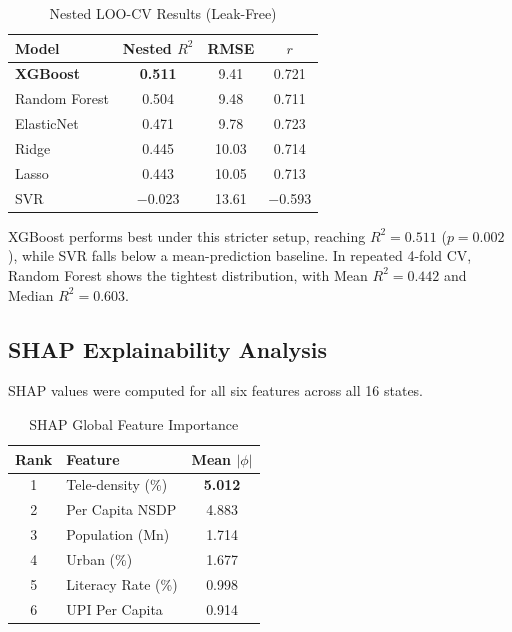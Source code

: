 \documentclass[conference]{IEEEtran}
\begin{document}
\begin{table}[!t]
\centering
\caption{Nested LOO-CV Results (Leak-Free)}
\label{tab:nested_cv}
\renewcommand{\arraystretch}{1.15}
\begin{tabular}{@{}lccc@{}}
\toprule
\textbf{Model} & \textbf{Nested $R^2$} & \textbf{RMSE} & \textbf{$r$} \\
\midrule
\textbf{XGBoost} & \textbf{0.511} & 9.41 & 0.721 \\
Random Forest    & 0.504          & 9.48 & 0.711 \\
ElasticNet       & 0.471          & 9.78 & 0.723 \\
Ridge            & 0.445          & 10.03 & 0.714 \\
Lasso            & 0.443          & 10.05 & 0.713 \\
SVR              & $-$0.023       & 13.61 & $-$0.593 \\
\bottomrule
\end{tabular}
\end{table}

XGBoost performs best under this stricter setup, reaching $R^2 = 0.511$ ($p = 0.002$), while SVR falls below a mean-prediction baseline. In repeated 4-fold CV, Random Forest shows the tightest distribution, with Mean $R^2 = 0.442$ and Median $R^2 = 0.603$.

\subsection{SHAP Explainability Analysis}

SHAP values were computed for all six features across all 16 states.

\begin{table}[!t]
\centering
\caption{SHAP Global Feature Importance}
\label{tab:shap}
\renewcommand{\arraystretch}{1.15}
\begin{tabular}{@{}clc@{}}
\toprule
\textbf{Rank} & \textbf{Feature} & \textbf{Mean $|\phi|$} \\
\midrule
1 & Tele-density (\%)          & \textbf{5.012} \\
2 & Per Capita NSDP            & 4.883 \\
3 & Population (Mn)            & 1.714 \\
4 & Urban (\%)                 & 1.677 \\
5 & Literacy Rate (\%)         & 0.998 \\
6 & UPI Per Capita             & 0.914 \\
\bottomrule
\end{tabular}
\end{table}
\end{document}
